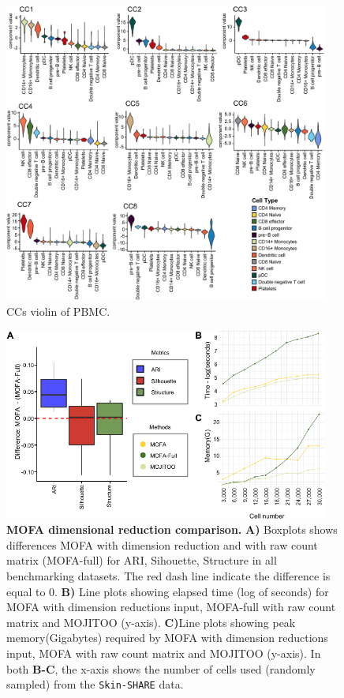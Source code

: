 \begin{figure}[!ht]
  \centering
  \includegraphics[width=0.95\textwidth]{CCs_violin/fig}
  \vspace{0.1cm}
  \caption[CCs violin of PBMC.]{CCs violin of PBMC.}
  \label{fig:CCs_violin}
\end{figure}


\begin{figure}[!ht]
	\centering
	\includegraphics[width=0.95\textwidth]{MOFA/fig}
	\vspace{0.1cm}
	\caption[MOFA dimensional reduction comparison.]{\textbf{MOFA dimensional reduction comparison.} \textbf{A)} Boxplots shows differences MOFA with dimension reduction and with raw count matrix (MOFA-full) for ARI, Sihouette, Structure in all benchmarking datasets. The red dash line indicate the difference is equal to 0. \textbf{B)} Line plots showing elapsed time (log of seconds) for MOFA with dimension reductions input, MOFA-full with raw count matrix and MOJITOO (y-axis). \textbf{C)}Line plots showing peak memory(Gigabytes) required by MOFA with dimension reductions input, MOFA with raw count matrix and MOJITOO (y-axis). In both \textbf{B-C}, the x-axis shows the number of cells used (randomly sampled) from the \texttt{Skin-SHARE} data.}
	\label{fig:MOFA}
\end{figure}


